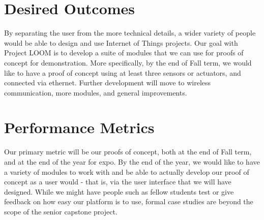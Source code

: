 \documentclass[onecolumn, draftclsnofoot,10pt, compsoc]{IEEEtran}
\begin{document}
\section{Desired Outcomes}
    By separating the user from the more technical details, a wider variety of people would be able to design and use Internet of Things projects. Our goal with Project LOOM is to develop a suite of modules that we can use for proofs of concept for demonstration. More specifically, by the end of Fall term, we would like to have a proof of concept using at least three sensors or actuators, and connected via ethernet. Further development will move to wireless communication, more modules, and general improvements. 

\section{Performance Metrics}
    Our primary metric will be our proofs of concept, both at the end of Fall term, and at the end of the year for expo. By the end of the year, we would like to have a variety of modules to work with and be able to actually develop our proof of concept as a user would - that is, via the user interface that we will have designed. While we might have people such as fellow students test or give feedback on how easy our platform is to use, formal case studies are beyond the scope of the senior capstone project.
    
\end{document}
